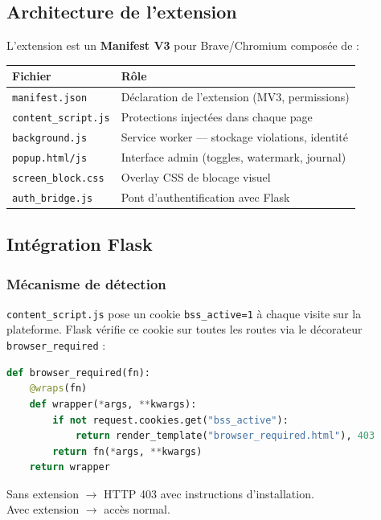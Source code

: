 \documentclass[12pt,a4paper]{article}
\begin{document}
\subsection{Architecture de l'extension}

L'extension est un \textbf{Manifest V3} pour Brave/Chromium composée de :

\begin{center}
\begin{tabular}{|l|l|}
\hline
\textbf{Fichier} & \textbf{Rôle} \\
\hline
\texttt{manifest.json}      & Déclaration de l'extension (MV3, permissions) \\
\texttt{content\_script.js} & Protections injectées dans chaque page \\
\texttt{background.js}      & Service worker — stockage violations, identité \\
\texttt{popup.html/js}      & Interface admin (toggles, watermark, journal) \\
\texttt{screen\_block.css}  & Overlay CSS de blocage visuel \\
\texttt{auth\_bridge.js}    & Pont d'authentification avec Flask \\
\hline
\end{tabular}
\end{center}

\subsection{Intégration Flask}

\subsubsection*{Mécanisme de détection}

\texttt{content\_script.js} pose un cookie \texttt{bss\_active=1} à chaque visite sur la plateforme. Flask vérifie ce cookie sur toutes les routes via le décorateur \texttt{browser\_required} :

\begin{lstlisting}[language=Python, caption={authz.py — décorateur browser\_required}]
def browser_required(fn):
    @wraps(fn)
    def wrapper(*args, **kwargs):
        if not request.cookies.get("bss_active"):
            return render_template("browser_required.html"), 403
        return fn(*args, **kwargs)
    return wrapper
\end{lstlisting}

Sans extension $\rightarrow$ HTTP 403 avec instructions d'installation.\\
Avec extension $\rightarrow$ accès normal.
\end{document}

